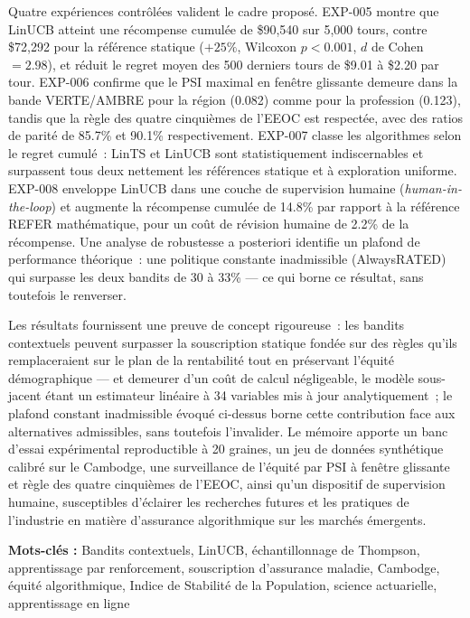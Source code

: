 Quatre expériences contrôlées valident le cadre proposé. EXP-005 montre que LinUCB atteint une récompense cumulée de \$90{,}540 sur 5{,}000 tours, contre \$72{,}292 pour la référence statique ($+25\%$, Wilcoxon $p < 0.001$, $d$ de Cohen $= 2.98$), et réduit le regret moyen des 500 derniers tours de \$9.01 à \$2.20 par tour. EXP-006 confirme que le PSI maximal en fenêtre glissante demeure dans la bande VERTE/AMBRE pour la région (0.082) comme pour la profession (0.123), tandis que la règle des quatre cinquièmes de l'EEOC est respectée, avec des ratios de parité de 85.7\% et 90.1\% respectivement. EXP-007 classe les algorithmes selon le regret cumulé~: LinTS et LinUCB sont statistiquement indiscernables et surpassent tous deux nettement les références statique et à exploration uniforme. EXP-008 enveloppe LinUCB dans une couche de supervision humaine (\emph{human-in-the-loop}) et augmente la récompense cumulée de 14.8\% par rapport à la référence REFER mathématique, pour un coût de révision humaine de 2.2\% de la récompense. Une analyse de robustesse a posteriori identifie un plafond de performance théorique~: une politique constante inadmissible (AlwaysRATED) qui surpasse les deux bandits de 30 à 33\% --- ce qui borne ce résultat, sans toutefois le renverser.

Les résultats fournissent une preuve de concept rigoureuse~: les bandits contextuels peuvent surpasser la souscription statique fondée sur des règles qu'ils remplaceraient sur le plan de la rentabilité tout en préservant l'équité démographique --- et demeurer d'un coût de calcul négligeable, le modèle sous-jacent étant un estimateur linéaire à 34 variables mis à jour analytiquement~; le plafond constant inadmissible évoqué ci-dessus borne cette contribution face aux alternatives admissibles, sans toutefois l'invalider. Le mémoire apporte un banc d'essai expérimental reproductible à 20 graines, un jeu de données synthétique calibré sur le Cambodge, une surveillance de l'équité par PSI à fenêtre glissante et règle des quatre cinquièmes de l'EEOC, ainsi qu'un dispositif de supervision humaine, susceptibles d'éclairer les recherches futures et les pratiques de l'industrie en matière d'assurance algorithmique sur les marchés émergents.

\bigskip
\noindent\textbf{Mots-clés :} Bandits contextuels, LinUCB, échantillonnage de Thompson, apprentissage par renforcement, souscription d'assurance maladie, Cambodge, équité algorithmique, Indice de Stabilité de la Population, science actuarielle, apprentissage en ligne
